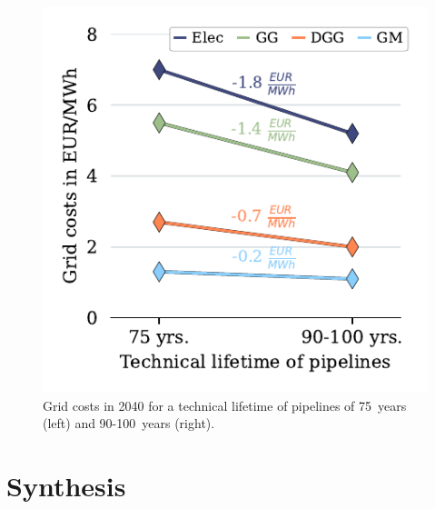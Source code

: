 \begin{figure}[h]
	\centering
	\includegraphics[width=0.6\linewidth]{figures/results/grid_charges_development/cleaned_grid_charges.pdf}
	\caption{Grid costs in 2040 for a technical lifetime of pipelines of \SI{75}{years} (left) and 90-\SI{100}{years} (right).}
	\label{fig_grid_charges_no_capex}
\end{figure}

\section{Synthesis}\label{synthesis}



